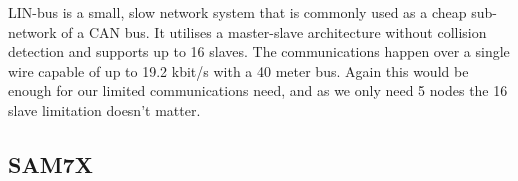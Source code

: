 LIN-bus is a small, slow network system that is commonly used as a cheap
sub-network of a CAN bus.  It utilises a master-slave architecture without
collision detection and supports up to 16 slaves.  The communications happen
over a single wire capable of up to 19.2 kbit/s with a 40 meter bus.  Again this
would be enough for our limited communications need, and as we only need 5 nodes
the 16 slave limitation doesn't matter.


\subsection{SAM7X}


